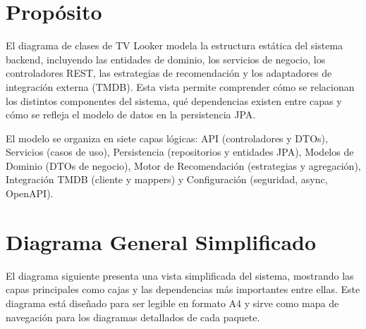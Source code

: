 \newcommand{\ProjectName}{TV Looker}
\newcommand{\diagramplaceholder}[2]{%
  \begin{figure}[H]\centering
  \fbox{\parbox{0.9\textwidth}{\centering\vspace{2cm}\textbf{#1}\\\vspace{0.5cm}#2\vspace{2cm}}}
  \caption{#1}\end{figure}}
\newcommand{\technicalnotes}[1]{\subsection*{Notas técnicas}#1}
\newcommand{\xrefnote}[1]{\medskip\noindent\textbf{Referencia cruzada:} #1}


\section{Propósito}

El diagrama de clases de \ProjectName{} modela la estructura estática del sistema backend, incluyendo las entidades de dominio, los servicios de negocio, los controladores REST, las estrategias de recomendación y los adaptadores de integración externa (TMDB). Esta vista permite comprender cómo se relacionan los distintos componentes del sistema, qué dependencias existen entre capas y cómo se refleja el modelo de datos en la persistencia JPA.

El modelo se organiza en siete capas lógicas: API (controladores y DTOs), Servicios (casos de uso), Persistencia (repositorios y entidades JPA), Modelos de Dominio (DTOs de negocio), Motor de Recomendación (estrategias y agregación), Integración TMDB (cliente y mappers) y Configuración (seguridad, async, OpenAPI).

\section{Diagrama General Simplificado}

El diagrama siguiente presenta una vista simplificada del sistema, mostrando las capas principales como cajas y las dependencias más importantes entre ellas. Este diagrama está diseñado para ser legible en formato A4 y sirve como mapa de navegación para los diagramas detallados de cada paquete.

